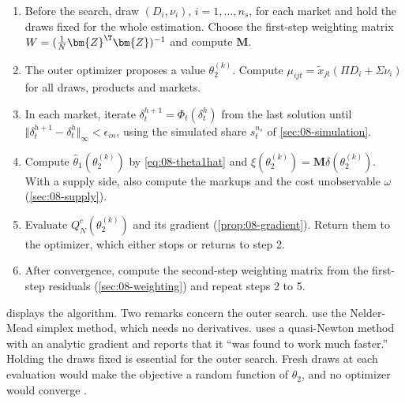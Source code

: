 \begin{enumerate}[label=\arabic*.,leftmargin=2em]
  \item Before the search, draw $(D_i, \nu_i)$, $i = 1, \dots, n_s$, for each market and hold the draws fixed
  for the whole estimation. Choose the first-step weighting matrix $W = (\frac{1}{N}\bm{Z}^\T\bm{Z})^{-1}$ and
  compute $\bm{M}$.
  \item The outer optimizer proposes a value $\theta_2^{(k)}$. Compute $\mu_{ijt} = \tilde x_{jt}(\Pi D_i +
  \Sigma\nu_i)$ for all draws, products and markets.
  \item In each market, iterate $\delta^{h+1}_t = \Phi_t(\delta^h_t)$ from the last solution until $\Vert
  \delta^{h+1}_t - \delta^h_t\Vert_\infty < \epsilon_{in}$, using the simulated share $s^{n_s}_t$ of
  \cref{sec:08-simulation}.
  \item Compute $\hat\theta_1(\theta_2^{(k)})$ by \eqref{eq:08-theta1hat} and $\xi(\theta_2^{(k)}) =
  \bm{M}\delta(\theta_2^{(k)})$. With a supply side, also compute the markups and the cost unobservable
  $\omega$ (\cref{sec:08-supply}).
  \item Evaluate $Q^c_N(\theta_2^{(k)})$ and its gradient (\cref{prop:08-gradient}). Return them to the
  optimizer, which either stops or returns to step 2.
  \item After convergence, compute the second-step weighting matrix from the first-step residuals
  (\cref{sec:08-weighting}) and repeat steps 2 to 5.
\end{enumerate}

 displays the algorithm. Two remarks concern the outer search. \citet[p.~868]%
{BerryLevinsohnPakes1995} use the Nelder-Mead simplex method, which needs no derivatives. \citet[p.~319]%
{Nevo2001} uses a quasi-Newton method with an analytic gradient and reports that it ``was found to work much
faster.'' Holding the draws fixed is essential for the outer search. Fresh draws at each evaluation would make
the objective a random function of $\theta_2$, and no optimizer would converge \citep{PakesPollard1989}.

